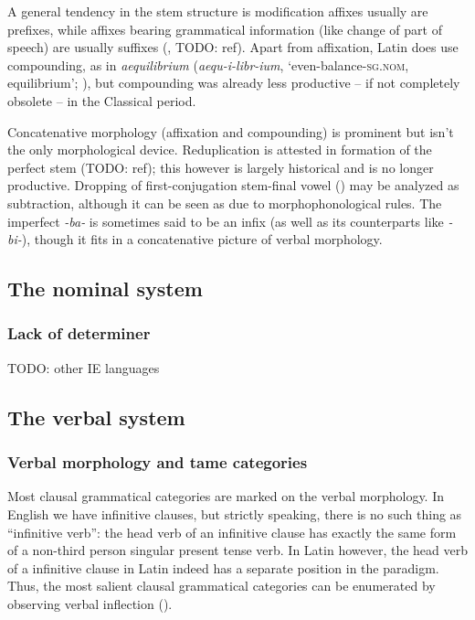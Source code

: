 \documentclass[a4paper, oneside]{report}
\newcommand*{\citesec}[1]{\S~{#1}}
\newcommand{\form}[1]{\emph{#1}}
\newcommand*{\category}[1]{\textsc{#1}}
\newcommand{\translate}[1]{`#1'}
\begin{document}
A general tendency in the stem structure 
is modification affixes usually are prefixes,
while affixes bearing grammatical information 
(like change of part of speech) 
are usually suffixes
(, TODO: ref).
Apart from affixation,
Latin does use compounding, as in \form{aequilibrium} 
(\form{aequ-i-libr-ium}, \translate{even-balance-\category{sg.nom}, equilibrium};
\citealt[\citesec{92}]{smith2016greek}),
but compounding was already less productive -- if not completely obsolete --
in the Classical period.

Concatenative morphology (affixation and compounding) 
is prominent but isn't the only morphological device.
Reduplication is attested in 
formation of the perfect stem (TODO: ref);
this however is largely historical 
and is no longer productive.
Dropping of first-conjugation stem-final vowel ()
may be analyzed as subtraction,
although it can be seen as due to morphophonological rules.
The imperfect \form{-ba-} is sometimes said to be an infix 
(as well as its counterparts like \form{-bi-}),
though it fits in a concatenative picture of verbal morphology.

\subsection{The nominal system}

\subsubsection{Lack of determiner}

TODO: other IE languages

\subsection{The verbal system}

\subsubsection{Verbal morphology and \acs{tame} categories}

Most clausal grammatical categories are marked on the verbal morphology.
In English we have infinitive clauses,
but strictly speaking, there is no such thing as ``infinitive verb'':
the head verb of an infinitive clause 
has exactly the same form of a non-third person singular present tense verb.
In Latin however, the head verb of a infinitive clause in Latin 
indeed has a separate position in the paradigm.
Thus, the most salient clausal grammatical categories can be enumerated  
by observing verbal inflection ().
\end{document}
